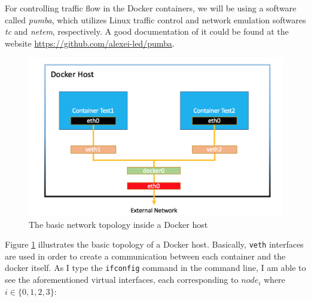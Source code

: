 \documentclass{article}
\begin{document}
For controlling traffic flow in the Docker containers, we will be using a software called \textit{pumba}, which utilizes Linux traffic control and network emulation softwares \textit{tc} and \textit{netem}, respectively. A good documentation of it could be found at the website \url{https://github.com/alexei-led/pumba}.

\begin{figure}
    \centering
    \includegraphics[width=\linewidth]{Pictures/docker_interfaces.png}
    \caption{The basic network topology inside a Docker host}
    \label{fig:interfaces}
\end{figure}

Figure \ref{fig:interfaces} illustrates the basic topology of a Docker host. Basically, \texttt{veth} interfaces are used in order to create a communication between each container and the docker itself. As I type the \texttt{ifconfig} command in the command line, I am able to see the aforementioned virtual interfaces, each corresponding to $node_i$ where $i \in \{0,1,2,3\}$:
\end{document}
